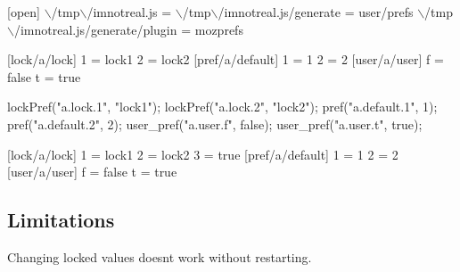 \begin{DoxyCode}

[open]
\(\backslash\)/tmp\(\backslash\)/imnotreal.js =
\(\backslash\)/tmp\(\backslash\)/imnotreal.js/generate = user/prefs
\(\backslash\)/tmp\(\backslash\)/imnotreal.js/generate/plugin = mozprefs



[lock/a/lock]
1 = lock1
2 = lock2
[pref/a/default]
1 = 1
2 = 2
[user/a/user]
f = false
t = true


lockPref("a.lock.1", "lock1");
lockPref("a.lock.2", "lock2");
pref("a.default.1", 1);
pref("a.default.2", 2);
user\_pref("a.user.f", false);
user\_pref("a.user.t", true);
\end{DoxyCode}



\begin{DoxyCode}
\end{DoxyCode}


 
\begin{DoxyCode}

[lock/a/lock]
1 = lock1
2 = lock2
3 = true
[pref/a/default]
1 = 1
2 = 2
[user/a/user]
f = false
t = true
\end{DoxyCode}
 

\subsection*{Limitations}

Changing locked values doesn\textquotesingle{}t work without restarting. 